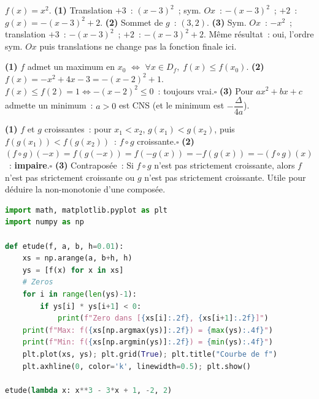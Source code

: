 
$f(x)=x^2$.
\textbf{(1)} Translation $+3$~: $(x-3)^2$~; sym. $Ox$~: $-(x-3)^2$~; $+2$~: $g(x)=-(x-3)^2+2$.
\textbf{(2)} Sommet de $g$~: $(3,2)$.
\textbf{(3)} Sym. $Ox$~: $-x^2$~; translation $+3$~: $-(x-3)^2$~; $+2$~: $-(x-3)^2+2$.
M\^eme r\'esultat~: oui, l'ordre sym. $Ox$ puis translations ne change pas la fonction finale ici.


\textbf{(1)} \og $f$ admet un maximum en $x_0$\fg{} $\Leftrightarrow$
\og $\forall x\in D_f,\;f(x)\leq f(x_0)$\fg{}.
\textbf{(2)} $f(x)=-x^2+4x-3=-(x-2)^2+1$.
$f(x)\leq f(2)=1\Leftrightarrow-(x-2)^2\leq0$~: toujours vrai.\hfill$\square$
\textbf{(3)} Pour $ax^2+bx+c$ admette un minimum~: $a>0$ est CNS (et le minimum est $-\dfrac{\Delta}{4a}$).


\textbf{(1)} $f$ et $g$ croissantes~: pour $x_1<x_2$, $g(x_1)<g(x_2)$, puis $f(g(x_1))<f(g(x_2))$~: $f\circ g$ croissante.\hfill$\square$
\textbf{(2)} $(f\circ g)(-x)=f(g(-x))=f(-g(x))=-f(g(x))=-(f\circ g)(x)$~: \textbf{impaire}.\hfill$\square$
\textbf{(3)} Contrapos\'ee~: \og Si $f\circ g$ n'est pas strictement croissante, alors $f$ n'est pas strictement croissante ou $g$ n'est pas strictement croissante.\fg
Utile pour d\'eduire la non-monotonie d'une compos\'ee.


\begin{lstlisting}[language=Python]
import math, matplotlib.pyplot as plt
import numpy as np

def etude(f, a, b, h=0.01):
    xs = np.arange(a, b+h, h)
    ys = [f(x) for x in xs]
    # Zeros
    for i in range(len(ys)-1):
        if ys[i] * ys[i+1] < 0:
            print(f"Zero dans [{xs[i]:.2f}, {xs[i+1]:.2f}]")
    print(f"Max: f({xs[np.argmax(ys)]:.2f}) = {max(ys):.4f}")
    print(f"Min: f({xs[np.argmin(ys)]:.2f}) = {min(ys):.4f}")
    plt.plot(xs, ys); plt.grid(True); plt.title("Courbe de f")
    plt.axhline(0, color='k', linewidth=0.5); plt.show()

etude(lambda x: x**3 - 3*x + 1, -2, 2)
\end{lstlisting}

